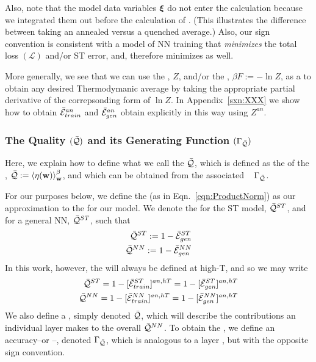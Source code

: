 {Also, note that the model data variables $\boldsymbol{\xi}$ do not enter the calculation because we 
integrated them out before the calculation of \ThermalAverage.
(This illustrates the difference between taking an annealed versus a quenched average.)
Also, our sign convention is consistent with a model of NN training that \emph{minimizes} the total loss
$(\mathcal{L})$ and/or ST error, and, therefore minimizes \FreeEnergies as well.

More generally, we see that we can use the \PartitionFunction, $Z$,
and/or the \FreeEnergy, $\beta F:=-\ln Z$, as a \GeneratingFunction to obtain any
desired Thermodymanic average by taking the appropriate partial derivative
of the correpsonding form of $\ln Z$.
In Appendix~\ref{sxn:XXX} we show how to obtain 
$\bar{\mathcal{E}}_{train}^{an}$ and $\bar{\mathcal{E}}_{gen}^{an}$ obtain explicitly in this way using $Z^{an}$.


\subsubsection{The Quality $(\bar{\mathcal{Q}})$ and its Generating Function $(\Gamma_{\bar{\mathcal{Q}}})$}
Here, we explain how to define what we call the \Quality $\bar{\mathcal{Q}}$, which is
defined as the \ThermalAverage of the \SelfOverlap,  $\bar{\mathcal{Q}}:=\left\langle \eta({\mathbf{w}}) \right\rangle_{\mathbf w}^{\beta}$,
and which can be obtained from the associated \emph{\Quality~\GeneratingFunction} $\Gamma_{\bar{\mathcal{Q}}}$.

For our purposes below, we define the \ModelQuality (as in Eqn.~\ref{eqn:ProductNorm}) as our approximation to the
\AverageGeneralizationAccuracy for our model. 
We denote the \ModelQuality for the ST \Perceptron model, $\bar{\mathcal{Q}}^{ST}$,
and for a general NN, $\bar{\mathcal{Q}}^{ST}$, such that
\begin{align}
  \label{eqn:model_pre_qualities}
\bar{\mathcal{Q}}^{ST}:=1-\bar{\mathcal{E}}_{gen}^{ST}  \\ 
\bar{\mathcal{Q}}^{NN}:=1-\bar{\mathcal{E}}_{gen}^{NN}  
\end{align}
In this work, however, the \Quality will always be defined at high-T, and so we may write
\begin{align}
  \label{eqn:model_qualities}
  \bar{\mathcal{Q}}^{ST}=1-[\bar{\mathcal{E}}_{train}^{ST}]^{an,hT}=1-[\bar{\mathcal{E}}_{gen}^{ST}]^{an,hT} \\
  \bar{\mathcal{Q}}^{NN}=1-[\bar{\mathcal{E}}_{train}^{NN}]^{an,hT}=1-[\bar{\mathcal{E}}_{gen}^{NN}]^{an,hT} 
\end{align}
We also define a \LayerQuality, simply denoted $\bar{\mathcal{Q}}$,
which will describe the contributions an individual layer makes to the overall \ModelQuality $\bar{\mathcal{Q}}^{NN}$.
To obtain the \LayerQuality, we define an accuracy--or \Quality--\GeneratingFunction, denoted $\Gamma_{\bar{\mathcal{Q}}}$, which
is analogous to a layer \FreeEnergy, but with the opposite sign convention.



}
